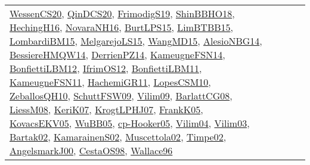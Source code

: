 {\begin{longtable}{llp{6cm}p{6cm}p{6cm}}
\href{papers/WessenCS20.pdf}{WessenCS20}\cite{WessenCS20}, \href{articles/QinDCS20.pdf}{QinDCS20}\cite{QinDCS20}, \href{papers/FrimodigS19.pdf}{FrimodigS19}\cite{FrimodigS19}, \href{articles/ShinBBHO18.pdf}{ShinBBHO18}\cite{ShinBBHO18}, \href{papers/HechingH16.pdf}{HechingH16}\cite{HechingH16}, \href{articles/NovaraNH16.pdf}{NovaraNH16}\cite{NovaraNH16}, \href{papers/BurtLPS15.pdf}{BurtLPS15}\cite{BurtLPS15}, \href{papers/LimBTBB15.pdf}{LimBTBB15}\cite{LimBTBB15}, \href{papers/LombardiBM15.pdf}{LombardiBM15}\cite{LombardiBM15}, \href{papers/MelgarejoLS15.pdf}{MelgarejoLS15}\cite{MelgarejoLS15}, \href{articles/WangMD15.pdf}{WangMD15}\cite{WangMD15}, \href{papers/AlesioNBG14.pdf}{AlesioNBG14}\cite{AlesioNBG14}, \href{papers/BessiereHMQW14.pdf}{BessiereHMQW14}\cite{BessiereHMQW14}, \href{papers/DerrienPZ14.pdf}{DerrienPZ14}\cite{DerrienPZ14}, \href{articles/KameugneFSN14.pdf}{KameugneFSN14}\cite{KameugneFSN14}, \href{papers/BonfiettiLBM12.pdf}{BonfiettiLBM12}\cite{BonfiettiLBM12}, \href{papers/IfrimOS12.pdf}{IfrimOS12}\cite{IfrimOS12}, \href{papers/BonfiettiLBM11.pdf}{BonfiettiLBM11}\cite{BonfiettiLBM11}, \href{papers/KameugneFSN11.pdf}{KameugneFSN11}\cite{KameugneFSN11}, \href{articles/HachemiGR11.pdf}{HachemiGR11}\cite{HachemiGR11}, \href{articles/LopesCSM10.pdf}{LopesCSM10}\cite{LopesCSM10}, \href{articles/ZeballosQH10.pdf}{ZeballosQH10}\cite{ZeballosQH10}, \href{papers/SchuttFSW09.pdf}{SchuttFSW09}\cite{SchuttFSW09}, \href{papers/Vilim09.pdf}{Vilim09}\cite{Vilim09}, \href{papers/BarlattCG08.pdf}{BarlattCG08}\cite{BarlattCG08}, \href{articles/LiessM08.pdf}{LiessM08}\cite{LiessM08}, \href{papers/KeriK07.pdf}{KeriK07}\cite{KeriK07}, \href{papers/KrogtLPHJ07.pdf}{KrogtLPHJ07}\cite{KrogtLPHJ07}, \href{papers/FrankK05.pdf}{FrankK05}\cite{FrankK05}, \href{papers/KovacsEKV05.pdf}{KovacsEKV05}\cite{KovacsEKV05}, \href{papers/WuBB05.pdf}{WuBB05}\cite{WuBB05}, \href{papers/cp-Hooker05.pdf}{cp-Hooker05}\cite{cp-Hooker05}, \href{papers/Vilim04.pdf}{Vilim04}\cite{Vilim04}, \href{papers/Vilim03.pdf}{Vilim03}\cite{Vilim03}, \href{papers/Bartak02.pdf}{Bartak02}\cite{Bartak02}, \href{papers/KamarainenS02.pdf}{KamarainenS02}\cite{KamarainenS02}, \href{papers/Muscettola02.pdf}{Muscettola02}\cite{Muscettola02}, \href{articles/Timpe02.pdf}{Timpe02}\cite{Timpe02}, \href{papers/AngelsmarkJ00.pdf}{AngelsmarkJ00}\cite{AngelsmarkJ00}, \href{papers/CestaOS98.pdf}{CestaOS98}\cite{CestaOS98}, \href{articles/Wallace96.pdf}{Wallace96}\cite{Wallace96}\\

\end{longtable}}

